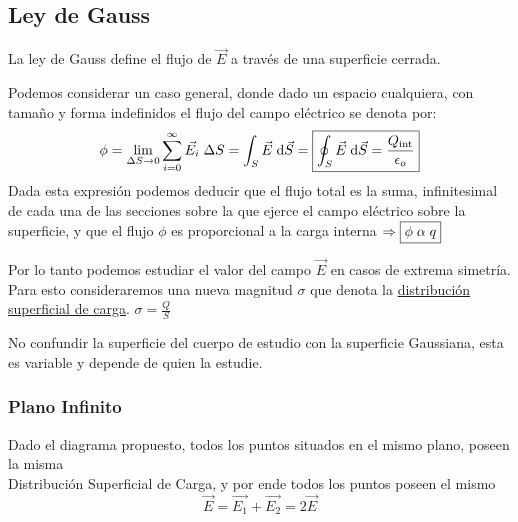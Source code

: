 \subsection{Ley de Gauss}
\hspace{10cm}
\begin{wrapfigure}{r}{3cm}
        
\end{wrapfigure}
La ley de Gauss define el flujo de \(\vec{E}\) a través de una superficie cerrada.\par
Podemos considerar un caso general, donde dado un espacio cualquiera, con tamaño y forma indefinidos el flujo del campo eléctrico se denota por:
\[
        \phi =\lim_{\Delta S \to 0}\sum_{i=0}^{\infty}\vec{E_i}\hspace{1mm}\Delta S = \int_{S}\vec{E}\hspace{1mm}\mathrm{d} \vec{S} = \boxed{\oint_{S} \vec{E} \hspace{1mm}\mathrm{d} \vec{S} = \frac{Q_\textnormal{int}}{\epsilon_o}}
\]
Dada esta expresión podemos deducir que el flujo total es la suma, infinitesimal de cada una de las secciones sobre la que ejerce el campo eléctrico sobre la superficie, y que el flujo \(\phi\) es proporcional a la carga interna \(\Rightarrow \boxed{\phi \hspace{1mm} \alpha \hspace{1mm} q}\) \par
\vspace{1cm}
\hspace{-.5cm}
Por lo tanto podemos estudiar el valor del campo \(\vec{E}\) en casos de extrema simetría.
Para esto consideraremos una nueva magnitud \(\sigma\) que denota la \underline{distribución superficial de carga}. \(\boxed{\sigma = \frac{Q}{S}}\)
\par \vspace{.5cm} \hspace{-.5cm}No confundir la superficie del cuerpo de estudio con la superficie Gaussiana, esta es variable y depende de quien la estudie.
\subsubsection{Plano Infinito}
\par
\hspace{-.5cm}Dado el diagrama propuesto, todos los puntos situados en el mismo plano, poseen la misma \\ \hspace{-.5cm} Distribución Superficial de Carga, y por ende todos los puntos poseen el mismo
\[\vec{E} = \vec{E_1} + \vec{E_2} = 2\vec{E}\]
